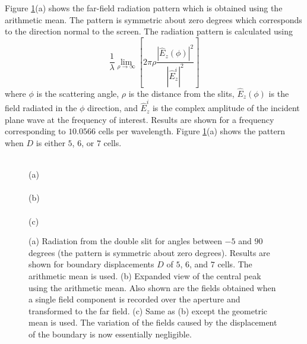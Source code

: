 Figure \ref{fig:youngArithmetic}(a) shows the far-field radiation
pattern which is obtained using the arithmetic mean.  The pattern is
symmetric about zero degrees which corresponds to the direction normal
to the screen.  The radiation pattern is calculated using
\begin{equation}
  \frac{1}{\lambda}\lim_{\rho\rightarrow\infty}
   \left[2\pi\rho\frac{|\hat{E}_z(\phi)|^2}{|\hat{E}_z^i|^2}\right]
  \label{eq:radPattern}
\end{equation}
where $\phi$ is the scattering angle, $\rho$ is the distance from the
slits, $\hat{E}_z(\phi)$ is the field radiated in the $\phi$
direction, and $\hat{E}_z^i$ is the complex amplitude of the incident
plane wave at the frequency of interest.  Results are shown for a
frequency corresponding to $10.0566$ cells per wavelength.  
Figure \ref{fig:youngArithmetic}(a) shows the pattern when 
$D$ is either $5$, $6$, or $7$ cells.
\begin{figure}
\begin{center}
\\
(a)\\
\vspace{.15in}
\\
(b)\\
\vspace{.15in}
\\
(c)
\end{center}
\caption{(a) Radiation from the double slit for angles between $-5$
and $90$ degrees (the pattern is symmetric about zero degrees).
Results are shown for boundary displacements $D$ of $5$, $6$, and $7$
cells.  The arithmetic mean is used.  (b) Expanded view of the central
peak using the arithmetic mean.  Also shown are the fields obtained
when a single field component is recorded over the aperture and
transformed to the far field.  (c) Same as (b) except the geometric
mean is used.  The variation of the fields caused by the displacement
of the boundary is now essentially negligible.}
\label{fig:youngArithmetic}
\end{figure}

